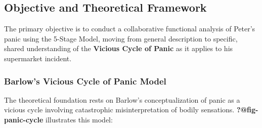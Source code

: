 \documentclass[
  american,
  11pt,
  11pt,
  letterpaper,
  onecolumn]{article}
\begin{document}
\subsection{Objective and Theoretical
Framework}\label{objective-and-theoretical-framework}

The primary objective is to conduct a collaborative functional analysis
of Peter's panic using the 5-Stage Model, moving from general
description to specific, shared understanding of the \textbf{Vicious
Cycle of Panic} as it applies to his supermarket incident.

\subsubsection{Barlow's Vicious Cycle of Panic
Model}\label{barlows-vicious-cycle-of-panic-model}

The theoretical foundation rests on Barlow's conceptualization of panic
as a vicious cycle involving catastrophic misinterpretation of bodily
sensations. \textbf{?@fig-panic-cycle} illustrates this model:
\end{document}
